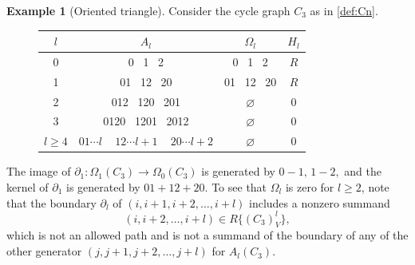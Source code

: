 \documentclass[11pt]{article}
\theoremstyle{definition}
\newtheorem{example}[theo]{Example}
\numberwithin{equation}{section}
\newcommand{\bd}{\partial}
\begin{document}
\begin{example}[Oriented triangle]\label{ex:homology_C3} 
Consider the cycle graph $C_3$ as in \cref{def:Cn}.

\begin{figure}[H]
\centering
        \end{figure}
\begin{figure}[H]
  \centering
         \begin{tabular}{||c||  c | c | c ||} 
         \hline
        $l$ &  $A_l$ & $\Omega_l$ & $H_l$ \\ [.5ex] 
         \hline\hline
        0 &  0 \, 1 \, 2 & 0 \, 1 \, 2 & $R$  \\ 
        \hline
        1 &  01 \, 12 \, 20  & 01 \, 12 \, 20 & $R$ \\
        \hline
        2 & 012 \, 120 \, 201 & $\varnothing$ & 0 \\
        \hline
        3 & 0120 \, 1201 \, 2012 & $\varnothing$ & 0 \\
        \hline
        $l \geq 4$  & $01\cdots l$\,\,\,\,\,  $12\cdots l{+}1$\,\,\,\,\,  $20\cdots l{+}2$& $\varnothing$ & 0 \\ [1ex] 
        \hline
        \end{tabular}
\end{figure}

The image of $\bd_1: \Omega_1(C_3) \to \Omega_0(C_3)$ is generated by $0-1,\, 1-2,$ and the kernel of $\bd_1$ is generated by $01+12+20.$ 
To see that $\Omega_l$ is zero for $l\geq 2$,
note that the boundary $\bd_l$ of $(i, i+1,i+2, \ldots ,i+l)$ includes a nonzero summand $$(i,i+2,\ldots, i+l)\in R\{(C_3)_V^l\},$$ which is not an allowed path and is not a summand of the boundary of any of the other generator $(j,j+1,j+2,\ldots, j+l)$ for $A_l(C_3).$ 
\end{example}
\end{document}

